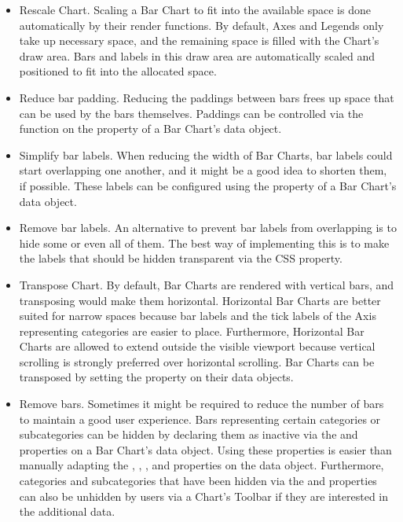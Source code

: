\begin{itemize}

\item
Rescale Chart.
Scaling a Bar Chart to fit into the available space is done automatically by their render functions.
By default, Axes and Legends only take up necessary space, and the remaining space is filled with the Chart's draw area.
Bars and labels in this draw area are automatically scaled and positioned to fit into the allocated space.

\item
Reduce bar padding.
Reducing the paddings between bars frees up space that can be used by the bars themselves.
Paddings can be controlled via the  function on the  property of a Bar Chart's data object. 

\item
Simplify bar labels.
When reducing the width of Bar Charts, bar labels could start overlapping one another, and it might be a good idea to shorten them, if possible. 
These labels can be configured using the  property of a Bar Chart's data object.

\item
Remove bar labels.
An alternative to prevent bar labels from overlapping is to hide some or even all of them.
The best way of implementing this is to make the labels that should be hidden transparent via the CSS  property.

\item
Transpose Chart.
By default, Bar Charts are rendered with vertical bars, and transposing would make them horizontal.
Horizontal Bar Charts are better suited for narrow spaces because bar labels and the tick labels of the Axis representing categories are easier to place.
Furthermore, Horizontal Bar Charts are allowed to extend outside the visible viewport because vertical scrolling is strongly preferred over horizontal scrolling.
Bar Charts can be transposed by setting the  property on their data objects.

\item
Remove bars.
Sometimes it might be required to reduce the number of bars to maintain a good user experience.
Bars representing certain categories or subcategories can be hidden by declaring them as inactive via the  and  properties on a Bar Chart's data object.
Using these properties is easier than manually adapting the , , , and  properties on the data object.
Furthermore, categories and subcategories that have been hidden via the  and  properties can also be unhidden by users via a Chart's Toolbar if they are interested in the additional data.  


\end{itemize}
